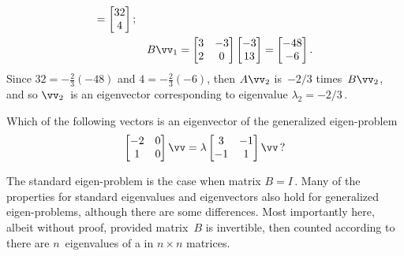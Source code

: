 \begin{reduce}
\begin{example}
\begin{solution}
\begin{itemize}
\begin{eqnarray*}
=\begin{bmatrix} 32\\4 \end{bmatrix};
\\&&B\vv_1=\begin{bmatrix} 3&-3\\2&0 \end{bmatrix}\begin{bmatrix} -3\\13 \end{bmatrix}
=\begin{bmatrix} -48\\-6 \end{bmatrix}.
\end{eqnarray*}
Since \(32=-\tfrac23(-48)\) and \(4=-\tfrac23(-6)\), then \(A\vv_2\) is~\(-2/3\) times~\(B\vv_2\), and so \(\vv_2\)~is an eigenvector corresponding to eigenvalue \(\lambda_2=-2/3\)\,.
\end{itemize}
\end{solution}
\end{example}


\begin{activity}
Which of the following vectors is an eigenvector of the generalized eigen-problem
\begin{equation*}
\begin{bmatrix} -2&0\\1&0 \end{bmatrix}\vv=\lambda\begin{bmatrix} 3&-1\\-1&1 \end{bmatrix}\vv\,?
\end{equation*}
\end{activity}


The standard eigen-problem is the case when matrix \(B=I\)\,.
Many of the properties for standard eigenvalues and eigenvectors also hold for generalized eigen-problems, although there are some differences.
Most importantly here, albeit without proof, provided matrix~\(B\) is invertible, then counted according to  there are \(n\)~eigenvalues of a  in \(n\times n\) matrices.


\end{reduce}
